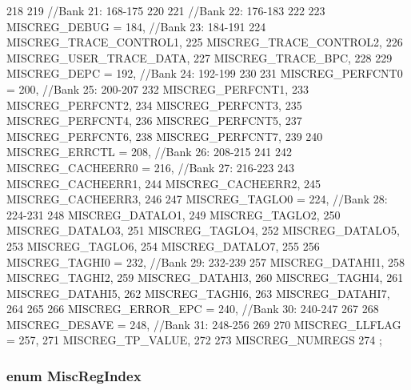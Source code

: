 \begin{DoxyCode}
{218 
219                        //Bank 21: 168-175
220 
221                        //Bank 22: 176-183
222 
223     MISCREG_DEBUG = 184,       //Bank 23: 184-191
224     MISCREG_TRACE_CONTROL1,
225     MISCREG_TRACE_CONTROL2,
226     MISCREG_USER_TRACE_DATA,
227     MISCREG_TRACE_BPC,
228 
229     MISCREG_DEPC = 192,        //Bank 24: 192-199
230 
231     MISCREG_PERFCNT0 = 200,    //Bank 25: 200-207
232     MISCREG_PERFCNT1,
233     MISCREG_PERFCNT2,
234     MISCREG_PERFCNT3,
235     MISCREG_PERFCNT4,
236     MISCREG_PERFCNT5,
237     MISCREG_PERFCNT6,
238     MISCREG_PERFCNT7,
239 
240     MISCREG_ERRCTL = 208,      //Bank 26: 208-215
241 
242     MISCREG_CACHEERR0 = 216,   //Bank 27: 216-223
243     MISCREG_CACHEERR1,
244     MISCREG_CACHEERR2,
245     MISCREG_CACHEERR3,
246 
247     MISCREG_TAGLO0 = 224,      //Bank 28: 224-231
248     MISCREG_DATALO1,
249     MISCREG_TAGLO2,
250     MISCREG_DATALO3,
251     MISCREG_TAGLO4,
252     MISCREG_DATALO5,
253     MISCREG_TAGLO6,
254     MISCREG_DATALO7,
255 
256     MISCREG_TAGHI0 = 232,      //Bank 29: 232-239
257     MISCREG_DATAHI1,
258     MISCREG_TAGHI2,
259     MISCREG_DATAHI3,
260     MISCREG_TAGHI4,
261     MISCREG_DATAHI5,
262     MISCREG_TAGHI6,
263     MISCREG_DATAHI7,
264 
265 
266     MISCREG_ERROR_EPC = 240,    //Bank 30: 240-247
267 
268     MISCREG_DESAVE = 248,       //Bank 31: 248-256
269 
270     MISCREG_LLFLAG = 257,
271     MISCREG_TP_VALUE,
272 
273     MISCREG_NUMREGS
274 };
\end{DoxyCode}
\hypertarget{namespaceMipsISA_a1e522017e015d4c7efd6b2360143aa67}{
\subsubsection[{MiscRegIndex}]{\setlength{\rightskip}{0pt plus 5cm}enum {\bf MiscRegIndex}}}
\label{namespaceMipsISA_a1e522017e015d4c7efd6b2360143aa67}
